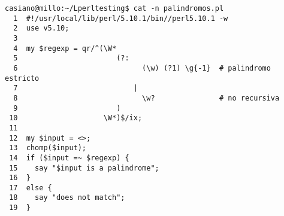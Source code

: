 \begin{latexonly}
\begin{verbatim}
casiano@millo:~/Lperltesting$ cat -n palindromos.pl
  1  #!/usr/local/lib/perl/5.10.1/bin//perl5.10.1 -w
  2  use v5.10;
  3
  4  my $regexp = qr/^(\W*
  5                       (?:
  6                             (\w) (?1) \g{-1}  # palindromo estricto
  7                           |
  8                             \w?               # no recursiva
  9                       )
 10                    \W*)$/ix;
 11
 12  my $input = <>;
 13  chomp($input);
 14  if ($input =~ $regexp) {
 15    say "$input is a palindrome";
 16  }
 17  else {
 18    say "does not match";
 19  }
\end{verbatim}
\end{latexonly}
\begin{rawhtml}


\end{rawhtml}

